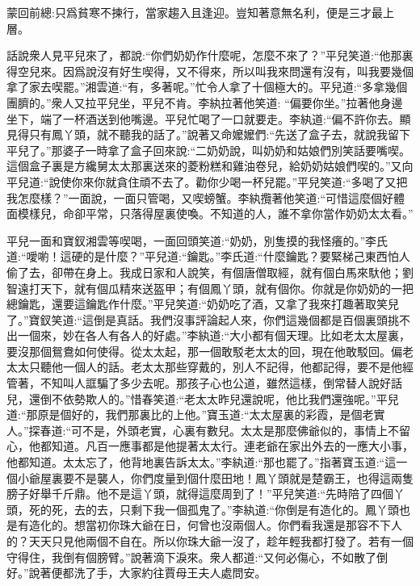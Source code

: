 
\begin{parag}
    \begin{note}蒙回前總:只爲貧寒不揀行，當家趨入且逢迎。豈知著意無名利，便是三才最上層。\end{note}
\end{parag}


\begin{parag}
    話說衆人見平兒來了，都說:“你們奶奶作什麼呢，怎麼不來了？”平兒笑道:“他那裏得空兒來。因爲說沒有好生喫得，又不得來，所以叫我來問還有沒有，叫我要幾個拿了家去喫罷。”湘雲道:“有，多著呢。”忙令人拿了十個極大的。平兒道:“多拿幾個團臍的。”衆人又拉平兒坐，平兒不肯。李紈拉著他笑道: “偏要你坐。”拉著他身邊坐下，端了一杯酒送到他嘴邊。平兒忙喝了一口就要走。李紈道:“偏不許你去。顯見得只有鳳丫頭，就不聽我的話了。”說著又命嬤嬤們:“先送了盒子去，就說我留下平兒了。”那婆子一時拿了盒子回來說:“二奶奶說，叫奶奶和姑娘們別笑話要嘴喫。這個盒子裏是方纔舅太太那裏送來的菱粉糕和雞油卷兒，給奶奶姑娘們喫的。”又向平兒道:“說使你來你就貪住頑不去了。勸你少喝一杯兒罷。”平兒笑道:“多喝了又把我怎麼樣？”一面說，一面只管喝，又喫螃蟹。李紈攬著他笑道:“可惜這麼個好體面模樣兒，命卻平常，只落得屋裏使喚。不知道的人，誰不拿你當作奶奶太太看。”
\end{parag}


\begin{parag}
    平兒一面和寶釵湘雲等喫喝，一面回頭笑道:“奶奶，別隻摸的我怪癢的。”李氏道:“噯喲！這硬的是什麼？”平兒道:“鑰匙。”李氏道:“什麼鑰匙？要緊梯己東西怕人偷了去，卻帶在身上。我成日家和人說笑，有個唐僧取經，就有個白馬來馱他；劉智遠打天下，就有個瓜精來送盔甲；有個鳳丫頭，就有個你。你就是你奶奶的一把總鑰匙，還要這鑰匙作什麼。”平兒笑道:“奶奶吃了酒，又拿了我來打趣著取笑兒了。”寶釵笑道:“這倒是真話。我們沒事評論起人來，你們這幾個都是百個裏頭挑不出一個來，妙在各人有各人的好處。”李紈道:“大小都有個天理。比如老太太屋裏，要沒那個鴛鴦如何使得。從太太起，那一個敢駁老太太的回，現在他敢駁回。偏老太太只聽他一個人的話。老太太那些穿戴的，別人不記得，他都記得，要不是他經管著，不知叫人誆騙了多少去呢。那孩子心也公道，雖然這樣，倒常替人說好話兒，還倒不依勢欺人的。”惜春笑道:“老太太昨兒還說呢，他比我們還強呢。”平兒道:“那原是個好的，我們那裏比的上他。”寶玉道:“太太屋裏的彩霞，是個老實人。”探春道:“可不是，外頭老實，心裏有數兒。太太是那麼佛爺似的，事情上不留心，他都知道。凡百一應事都是他提著太太行。連老爺在家出外去的一應大小事，他都知道。太太忘了，他背地裏告訴太太。”李紈道:“那也罷了。”指著寶玉道:“這一個小爺屋裏要不是襲人，你們度量到個什麼田地！鳳丫頭就是楚霸王，也得這兩隻膀子好舉千斤鼎。他不是這丫頭，就得這麼周到了！”平兒笑道:“先時陪了四個丫頭，死的死，去的去，只剩下我一個孤鬼了。”李紈道:“你倒是有造化的。鳳丫頭也是有造化的。想當初你珠大爺在日，何曾也沒兩個人。你們看我還是那容不下人的？天天只見他兩個不自在。所以你珠大爺一沒了，趁年輕我都打發了。若有一個守得住，我倒有個膀臂。”說著滴下淚來。衆人都道:“又何必傷心，不如散了倒好。”說著便都洗了手，大家約往賈母王夫人處問安。
\end{parag}



